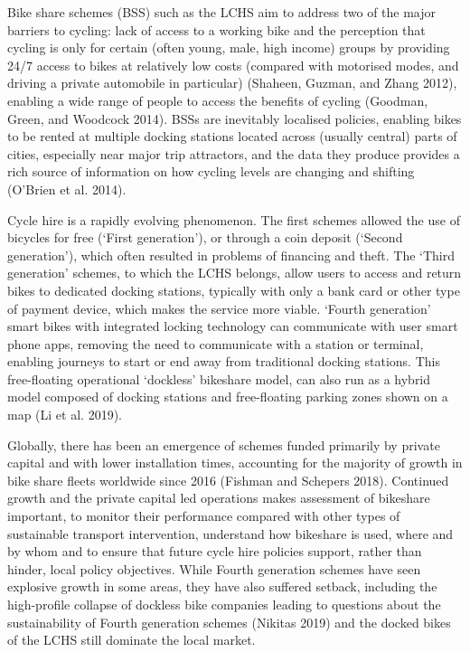 \documentclass[]{article}
\begin{document}
Bike share schemes (BSS) such as the LCHS aim to address two of the major barriers to cycling: lack of access to a working bike and the perception that cycling is only for certain (often young, male, high income) groups by providing 24/7 access to bikes at relatively low costs (compared with motorised modes, and driving a private automobile in particular) (Shaheen, Guzman, and Zhang 2012), enabling a wide range of people to access the benefits of cycling (Goodman, Green, and Woodcock 2014).
BSSs are inevitably localised policies, enabling bikes to be rented at multiple docking stations located across (usually central) parts of cities, especially near major trip attractors, and the data they produce provides a rich source of information on how cycling levels are changing and shifting (O'Brien et al. 2014).

Cycle hire is a rapidly evolving phenomenon.
The first schemes allowed the use of bicycles for free (`First generation'), or through a coin deposit (`Second generation'), which often resulted in problems of financing and theft.
The `Third generation' schemes, to which the LCHS belongs, allow users to access and return bikes to dedicated docking stations, typically with only a bank card or other type of payment device, which makes the service more viable.
`Fourth generation' smart bikes with integrated locking technology can communicate with user smart phone apps, removing the need to communicate with a station or terminal, enabling journeys to start or end away from traditional docking stations.
This free-floating operational `dockless' bikeshare model, can also run as a hybrid model composed of docking stations and free-floating parking zones shown on a map (Li et al. 2019).

Globally, there has been an emergence of schemes funded primarily by private capital and with lower installation times, accounting for the majority of growth in bike share fleets worldwide since 2016 (Fishman and Schepers 2018).
Continued growth and the private capital led operations makes assessment of bikeshare important, to monitor their performance compared with other types of sustainable transport intervention, understand how bikeshare is used, where and by whom and to ensure that future cycle hire policies support, rather than hinder, local policy objectives.
While Fourth generation schemes have seen explosive growth in some areas, they have also suffered setback, including the high-profile collapse of dockless bike companies leading to questions about the sustainability of Fourth generation schemes (Nikitas 2019) and the docked bikes of the LCHS still dominate the local market.
\end{document}
